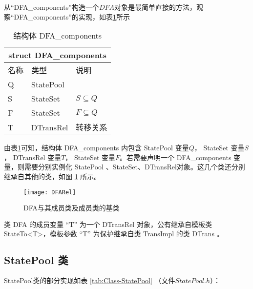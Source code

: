 从“DFA\_components”构造一个$DFA$对象是最简单直接的方法，观察“DFA\_components”的实现，如表\ref{tab:DFA-components}所示
\begin{table}[!htbp]
    \caption{结构体 DFA\_components}
    \label{tab:DFA-components}
    \centering
    \small%
    \setlength{\tabcolsep}{4pt}%
    \renewcommand{\arraystretch}{1.2}%
        \begin{tabular}{p{3em}<{\centering} p{5em}<{\raggedright} p{5em}<{\raggedright}} %
        \toprule 
         \multicolumn{3}{c}{struct DFA\_components} \\
        \midrule
        名称& 类型 & \mbox{说明} \\
        \midrule
        Q & StatePool &           \\
        S & StateSet  &  $S\subseteq Q$ \\
        F & StateSet  &  $F\subseteq Q$ \\
        T & DTransRel &  转移关系  \\
        \bottomrule
    \end{tabular}
\end{table}

由表\ref{tab:DFA-components}可知，结构体 DFA\_components 内包含 StatePool 变量$Q$， StateSet 变量$S$， DTransRel 变量$T$， StateSet 变量$F$。若需要声明一个 DFA\_components 变量，则需要分别实例化 StatePool 、StateSet、DTransRel对象。这几个类还分别继承自其他的类，如图 \ref{fig:DFARel} 所示。

\begin{figure}[!htbp]
    \centering
    \texttt{[image: DFARel]}
    \caption{DFA与其成员类及成员类的基类}
    \label{fig:DFARel}
\end{figure}

类 DFA 的成员变量 “T” 为一个 DTransRel 对象，公有继承自模板类 StateTo<T>，模板参数 “T” 为保护继承自类 TransImpl 的类 DTrans 。

\subsection{StatePool 类}
StatePool类的部分实现如表 \ref{tab:Class-StatePool} （文件$StatePool.h$）：

